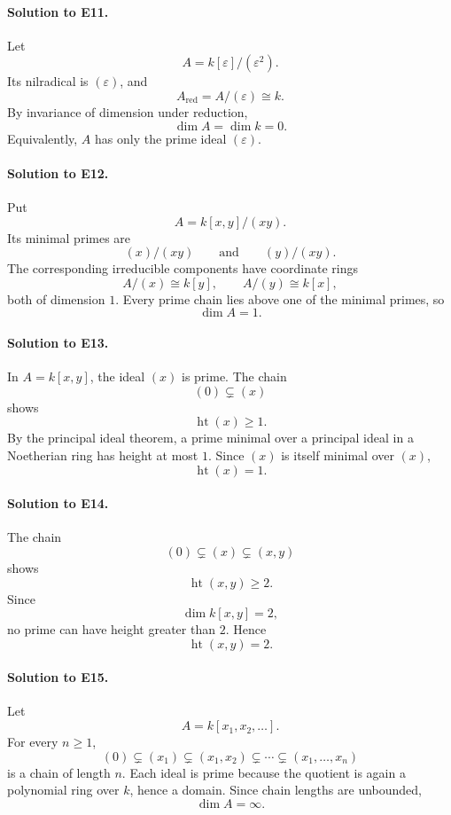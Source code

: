 \paragraph{Solution to E11.}
Let
\[
A=k[\varepsilon]/(\varepsilon^2).
\]
Its nilradical is \((\varepsilon)\), and
\[
A_{\mathrm{red}}=A/(\varepsilon)\cong k.
\]
By invariance of dimension under reduction,
\[
\dim A=\dim k=0.
\]
Equivalently, \(A\) has only the prime ideal \((\varepsilon)\).

\paragraph{Solution to E12.}
Put
\[
A=k[x,y]/(xy).
\]
Its minimal primes are
\[
(x)/(xy)\qquad\text{and}\qquad(y)/(xy).
\]
The corresponding irreducible components have coordinate rings
\[
A/(x)\cong k[y],
\qquad
A/(y)\cong k[x],
\]
both of dimension \(1\).  Every prime chain lies above one of the minimal primes, so
\[
\boxed{\dim A=1}.
\]

\paragraph{Solution to E13.}
In \(A=k[x,y]\), the ideal \((x)\) is prime.  The chain
\[
(0)\subsetneq(x)
\]
shows
\[
\operatorname{ht}(x)\ge1.
\]
By the principal ideal theorem, a prime minimal over a principal ideal in a Noetherian ring has
height at most \(1\).  Since \((x)\) is itself minimal over \((x)\),
\[
\boxed{\operatorname{ht}(x)=1}.
\]

\paragraph{Solution to E14.}
The chain
\[
(0)\subsetneq(x)\subsetneq(x,y)
\]
shows
\[
\operatorname{ht}(x,y)\ge2.
\]
Since
\[
\dim k[x,y]=2,
\]
no prime can have height greater than \(2\).  Hence
\[
\boxed{\operatorname{ht}(x,y)=2}.
\]

\paragraph{Solution to E15.}
Let
\[
A=k[x_1,x_2,\ldots].
\]
For every \(n\ge1\),
\[
(0)\subsetneq(x_1)\subsetneq(x_1,x_2)\subsetneq\cdots
\subsetneq(x_1,\ldots,x_n)
\]
is a chain of length \(n\).  Each ideal is prime because the quotient is again a polynomial ring
over \(k\), hence a domain.  Since chain lengths are unbounded,
\[
\boxed{\dim A=\infty}.
\]

